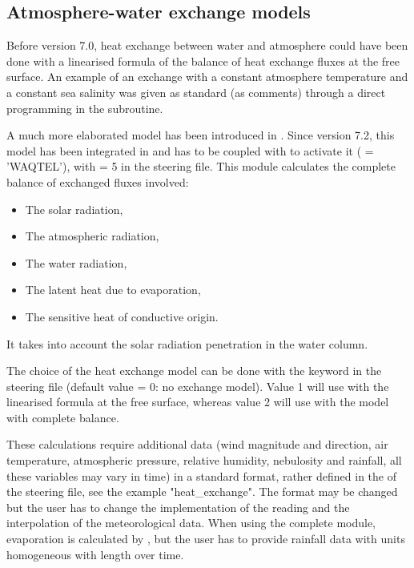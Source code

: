 \subsection{Atmosphere-water exchange models}

Before version 7.0, heat exchange between water and atmosphere could have been
done with a linearised formula of the balance of heat exchange fluxes at the
free surface. An example of an exchange with a constant atmosphere temperature
and a constant sea salinity was given as standard (as comments) through a
direct programming in the  subroutine.

A much more elaborated model has been introduced in .
Since version 7.2, this model has been integrated in \waqtel and
 has to be coupled with \waqtel to activate it
( = 'WAQTEL'), with
 = 5 in the \waqtel steering file.
This module calculates the complete balance of exchanged fluxes involved:

\begin{itemize}
\item  The solar radiation,

\item  The atmospheric radiation,

\item  The water radiation,

\item  The latent heat due to evaporation,

\item  The sensitive heat of conductive origin.
\end{itemize}

It takes into account the solar radiation penetration in the water column.

The choice of the heat exchange model can be done with the keyword
 in the \waqtel steering file
(default value = 0: no exchange
model). Value 1 will use with the linearised formula at the free surface,
whereas value 2 will use with the model with complete balance.

These calculations require additional data (wind magnitude and direction, air
temperature, atmospheric pressure, relative humidity, nebulosity and rainfall,
all these variables may vary in time) in a standard format, rather defined
in the  of the  steering file,
see the example "heat\_exchange". 
The format may be changed but the user has to change the
implementation of the reading and the interpolation of the meteorological data.
When using the complete module, evaporation is calculated by , but
the user has to provide rainfall data with units homogeneous with length over
time.

